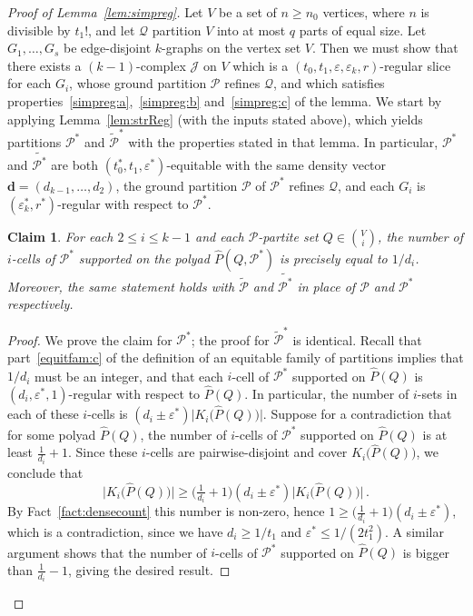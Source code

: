\documentclass[12pt,a4paper]{amsart}
\let\eps\varepsilon
\newtheorem{claim}[theorem] {Claim}
\newcommand{\oldqed}{}
\def\endofClaim{\hfill\scalebox{.6}{$\Box$}}
\newenvironment{claimproof}[1][Proof]{
  \renewcommand{\oldqed}{\qedsymbol}
  \renewcommand{\qedsymbol}{\endofClaim}
  \begin{proof}[#1]
}{
  \end{proof}
  \renewcommand{\qedsymbol}{\oldqed}
}
\newcommand{\cJ}{\mathcal{J}}
\newcommand{\Part}{\mathcal{P}}
\newcommand{\Qart}{\mathcal{Q}}
\begin{document}
\begin{proof}[Proof of Lemma~\ref{lem:simpreg}]
Let $V$ be a set of $n \geq n_0$ vertices, where $n$ is divisible by $t_1!$,
and let $\Qart$ partition $V$ into at most $q$ parts of equal size. Let
$G_1, \dots, G_s$ be edge-disjoint $k$-graphs on the vertex set $V$. Then we
must show that there exists a $(k-1)$-complex $\cJ$ on $V$ which is a
$(t_0,t_1,\eps,\eps_k,r)$-regular slice for each $G_i$, whose ground
partition $\Part$ refines $\Qart$, and which satisfies
properties~\ref{simpreg:a},~\ref{simpreg:b} and~\ref{simpreg:c} of the lemma. We
start by applying Lemma~\ref{lem:strReg} (with the inputs stated above), which
yields partitions $\Part^*$ and $\tilde{\Part}^*$ with the properties stated in that
lemma. In particular, $\Part^*$ and $\tilde{\Part^*}$ are both $(t_0^*,t_1,\eps^*)$-equitable with the same density vector $\mathbf{d} = (d_{k-1}, \dots, d_2)$, the ground partition $\Part$ of $\Part^*$ refines $\Qart$, and each $G_i$ is $(\eps^*_k,r^*)$-regular
with respect to $\Part^*$. 
 
\begin{claim}\label{claim:numcell} For each $2 \le i \le k-1$ and each $\Part$-partite set $Q \in \binom{V}{i}$, the number of $i$-cells of $\Part^*$ supported on the polyad $\hat{P}(Q, \Part^*)$ is precisely equal to $1/d_i$. Moreover, the same statement holds with $\tilde{\Part}$ and $\tilde{\Part^*}$ in place of $\Part$ and $\Part^*$ respectively. 
\end{claim}

\begin{claimproof} We prove the claim for $\Part^*$; the proof for $\tilde{\Part}^*$ is identical. Recall that part~\ref{equitfam:c} of the definition of an equitable family of partitions implies that $1/d_i$ must be an integer, and that each $i$-cell of $\Part^*$ supported on $\hat{P}(Q)$ is $(d_i,\eps^*,1)$-regular with respect to $\hat{P}(Q)$.
In particular, the number of $i$-sets in each of these $i$-cells is $(d_i\pm\eps^*)\big|K_i\big(\hat{P}(Q)\big)\big|$. 
Suppose for a contradiction that for some polyad $\hat{P}(Q)$, the number of $i$-cells of $\Part^*$ supported on $\hat{P}(Q)$ is at least $\tfrac{1}{d_i}+1$.
Since these $i$-cells are pairwise-disjoint and cover $K_i\big(\hat{P}(Q)\big)$, we conclude that
\[\big|K_i\big(\hat{P}(Q)\big)\big|\ge\big(\tfrac{1}{d_i}+1\big)(d_i\pm\eps^*)\big|K_i\big(\hat{P}(Q)\big)\big|\,.\]By Fact~\ref{fact:densecount} this number is non-zero, hence $1\ge\big(\tfrac{1}{d_i}+1\big)(d_i\pm\eps^*)$, which is a contradiction, since we have $d_i\ge 1/t_1$ and $\eps^*\le 1/(2t_1^2)$. A similar argument shows that the number of $i$-cells of $\Part^*$ supported on $\hat{P}(Q)$ is bigger than $\tfrac{1}{d_i}-1$, giving the desired result.
\end{claimproof}


\end{proof}
\end{document}
